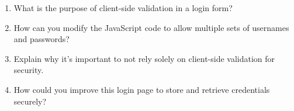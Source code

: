 \documentclass[a4paper,9pt]{article}
\begin{document}
\begin{enumerate}
	\item What is the purpose of client-side validation in a login form?
	
	\item How can you modify the JavaScript code to allow multiple sets of usernames and passwords?
	\item Explain why it's important to not rely solely on client-side validation for security.
	\item How could you improve this login page to store and retrieve credentials securely?
	
\end{enumerate}

\newpage


	    
\end{document}
